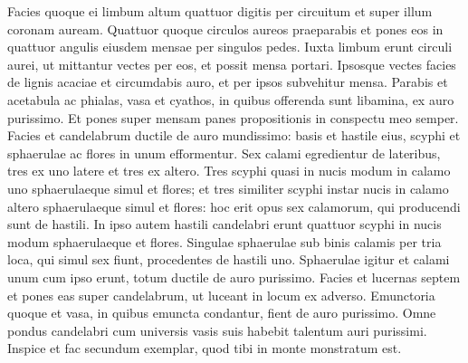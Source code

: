 \begin{biblechapter}
\begin{biblechapter}
\begin{biblechapter}
\begin{biblechapter}
\begin{biblechapter}
\begin{biblechapter}
\begin{biblechapter}
\begin{biblechapter}
\begin{biblechapter}
\begin{biblechapter}
\begin{biblechapter}
\begin{biblechapter}
\begin{biblechapter}
\begin{biblechapter}
\begin{biblechapter}
\begin{biblechapter}
\begin{biblechapter}
\begin{biblechapter}
\begin{biblechapter}
\begin{biblechapter}
\begin{biblechapter}
\begin{biblechapter}
\begin{biblechapter}
\begin{biblechapter}
\begin{biblechapter}
\verse Facies quoque ei limbum altum quattuor digitis per circuitum et super illum coronam auream. 
\verse Quattuor quoque circulos aureos praeparabis et pones eos in quattuor angulis eiusdem mensae per singulos pedes. 
\verse Iuxta limbum erunt circuli aurei, ut mittantur vectes per eos, et possit mensa portari. 
\verse Ipsosque vectes facies de lignis acaciae et circumdabis auro, et per ipsos subvehitur mensa. 
\verse Parabis et acetabula ac phialas, vasa et cyathos, in quibus offerenda sunt libamina, ex auro purissimo. 
\verse Et pones super mensam panes propositionis in conspectu meo semper.
 \verse Facies et candelabrum ductile de auro mundissimo: basis et hastile eius, scyphi et sphaerulae ac flores in unum efformentur. 
\verse Sex calami egredientur de lateribus, tres ex uno latere et tres ex altero. 
\verse Tres scyphi quasi in nucis modum in calamo uno sphaerulaeque simul et flores; et tres similiter scyphi instar nucis in calamo altero sphaerulaeque simul et flores: hoc erit opus sex calamorum, qui producendi sunt de hastili. 
\verse In ipso autem hastili candelabri erunt quattuor scyphi in nucis modum sphaerulaeque et flores. 
\verse Singulae sphaerulae sub binis calamis per tria loca, qui simul sex fiunt, procedentes de hastili uno. 
\verse Sphaerulae igitur et calami unum cum ipso erunt, totum ductile de auro purissimo. 
\verse Facies et lucernas septem et pones eas super candelabrum, ut luceant in locum ex adverso. 
\verse Emunctoria quoque et vasa, in quibus emuncta condantur, fient de auro purissimo. 
 \verse Omne pondus candelabri cum universis vasis suis habebit talentum auri purissimi. 
\verse Inspice et fac secundum exemplar, quod tibi in monte monstratum est.
 

\end{biblechapter}
\end{biblechapter}
\end{biblechapter}
\end{biblechapter}
\end{biblechapter}
\end{biblechapter}
\end{biblechapter}
\end{biblechapter}
\end{biblechapter}
\end{biblechapter}
\end{biblechapter}
\end{biblechapter}
\end{biblechapter}
\end{biblechapter}
\end{biblechapter}
\end{biblechapter}
\end{biblechapter}
\end{biblechapter}
\end{biblechapter}
\end{biblechapter}
\end{biblechapter}
\end{biblechapter}
\end{biblechapter}
\end{biblechapter}
\end{biblechapter}
